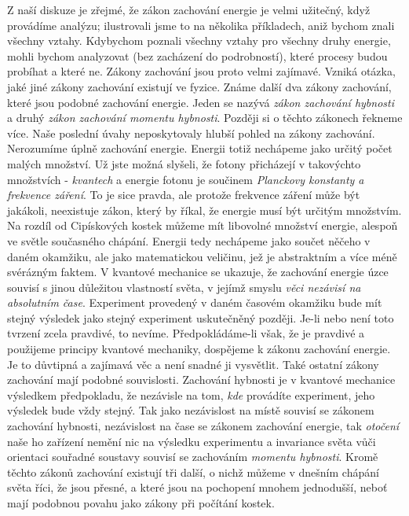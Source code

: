    Z naší diskuze je zřejmé, že zákon zachování energie je velmi užitečný, když provádíme analýzu; 
    ilustrovali jsme to na několika příkladech, aniž bychom znali všechny vztahy. Kdybychom poznali 
    všechny vztahy pro všechny druhy energie, mohli bychom analyzovat (bez zacházení do 
    podrobností), které procesy budou probíhat a které ne. Zákony zachování jsou proto velmi 
    zajímavé. Vzniká otázka, jaké jiné zákony zachování existují ve fyzice. Známe další dva zákony 
    zachování, které jsou podobné zachování energie. Jeden se nazývá \emph{zákon zachování 
    hybnosti} a druhý \emph{zákon zachování momentu hybnosti}. Později si o těchto zákonech řekneme 
    více. Naše poslední úvahy neposkytovaly hlubší pohled na zákony zachování. Nerozumíme úplně 
    zachování energie. Energii totiž nechápeme jako určitý počet malých množství. Už jste možná 
    slyšeli, že fotony přicházejí v takovýchto množstvích - \emph{kvantech} a energie fotonu je 
    součinem \emph{Planckovy konstanty a frekvence záření}. To je sice pravda, ale protože 
    frekvence záření může být jakákoli, neexistuje zákon, který by říkal, že energie musí být 
    určitým množstvím. Na rozdíl od Cipískových kostek můžeme mít libovolné množství energie, 
    alespoň ve světle současného chápání. Energii tedy nechápeme jako součet něčeho v daném 
    okamžiku, ale jako matematickou veličinu, jež je abstraktním a více méně svérázným faktem. V 
    kvantové mechanice se ukazuje, že zachování energie úzce souvisí s jinou důležitou vlastností 
    světa, v jejímž smyslu \emph{věci nezávisí na absolutním čase}. Experiment provedený v daném 
    časovém okamžiku bude mít stejný výsledek jako stejný experiment uskutečněný později. Je-li 
    nebo není toto tvrzení zcela pravdivé, to nevíme. Předpokládáme-li však, že je pravdivé a 
    použijeme principy kvantové mechaniky, dospějeme k zákonu zachování energie. Je to důvtipná a 
    zajímavá věc a není snadné ji vysvětlit. Také ostatní zákony zachování mají podobné 
    souvislosti. Zachování hybnosti je v kvantové mechanice výsledkem předpokladu, že nezávisle na 
    tom, \emph{kde} provádíte experiment, jeho výsledek bude vždy stejný. Tak jako nezávislost na 
    místě souvisí se zákonem zachování hybnosti, nezávislost na čase se zákonem zachování energie, 
    tak \emph{otočení} naše ho zařízení nemění nic na výsledku experimentu a invariance světa vůči 
    orientaci souřadné soustavy souvisí se zachováním \emph{momentu hybnosti}. Kromě těchto 
    zákonů zachování existují tři další, o nichž můžeme v dnešním chápání světa říci, že jsou 
    přesné, a které jsou na pochopení mnohem jednodušší, neboť mají podobnou povahu jako zákony při 
    počítání kostek.
    
